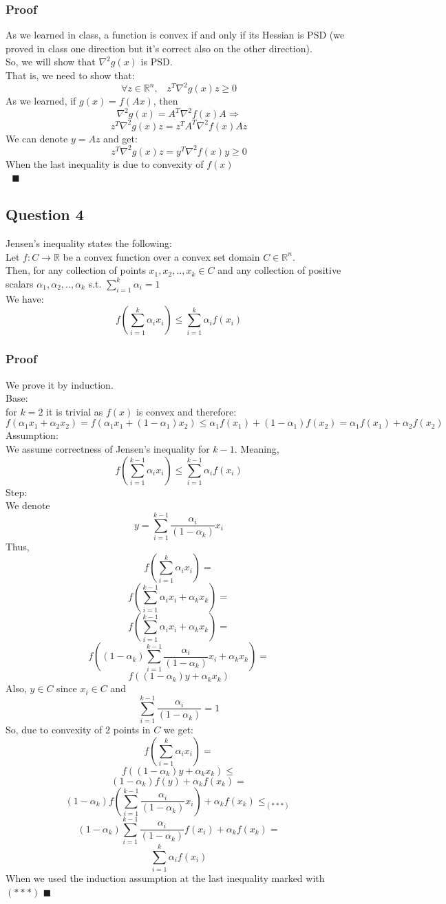 \documentclass[12pt]{article}
\newcommand{\qed}{\hfill$\blacksquare$}
\begin{document}
\subsubsection*{Proof}
As we learned in class, a function is convex if and only if its Hessian is PSD (we proved in class one direction but it's correct also on the other direction).\\
So, we will show that $\nabla^2 g(x)$ is PSD.\\
That is, we need to show that:
$$\forall z \in \mathbb{R}^n, \;\;\; z^T \nabla^2 g(x) z \geq 0$$
As we learned, if $g(x) = f(Ax)$, then 
$$\nabla^2 g(x) = A^T \nabla^2 f(x) A \Rightarrow$$
$$z^T \nabla^2 g(x) z = z^T A^T \nabla^2 f(x) A z$$
We can denote $y = Az$ and get:
$$z^T \nabla^2 g(x) z = y^T \nabla^2 f(x) y \geq 0$$
When the last inequality is due to convexity of $f(x)$\\
$\text{ }$\qed

\newpage
\subsection{Question 4}
Jensen's inequality states the following:\\
Let $f:C \rightarrow \mathbb{R}$ be a convex function over a convex set domain $C \in \mathbb{R}^n$.\\
Then, for any collection of points $x_1,x_2,..,x_k \in C$ and any collection of positive scalars $\alpha_1,\alpha_2,..,\alpha_k$ s.t. $\sum_{i=1}^k \alpha_i = 1$\\
We have:
$$f(\sum_{i=1}^k \alpha_i x_i) \leq \sum_{i=1}^k \alpha_i f(x_i)$$
\subsubsection*{Proof}
We prove it by induction.\\
Base:\\
for $k=2$ it is trivial as $f(x)$ is convex and therefore:
$$f(\alpha_1 x_1 + \alpha_2 x_2) = f(\alpha_1 x_1 + (1-\alpha_1) x_2) \leq \alpha_1 f(x_1) + (1-\alpha_1) f(x_2) = \alpha_1 f(x_1) + \alpha_2 f(x_2)$$
Assumption:\\
We assume correctness of Jensen's inequality for $k-1$. Meaning,
$$f(\sum_{i=1}^{k-1} \alpha_i x_i) \leq \sum_{i=1}^{k-1} \alpha_i f(x_i)$$
Step:\\
We denote $$y=\sum_{i=1}^{k-1} \frac{\alpha_i}{(1-\alpha_k)} x_i$$ Thus,
$$f(\sum_{i=1}^{k} \alpha_i x_i) = $$
$$f(\sum_{i=1}^{k-1} \alpha_i x_i + \alpha_k x_k) = $$
$$f(\sum_{i=1}^{k-1} \alpha_i x_i + \alpha_k x_k) =$$
$$ f((1-\alpha_k)\sum_{i=1}^{k-1} \frac{\alpha_i}{(1-\alpha_k)} x_i + \alpha_k x_k) =$$
$$f((1-\alpha_k)y + \alpha_k x_k)$$
Also, $y\in C$ since $x_i \in C$ and
$$\sum_{i=1}^{k-1} \frac{\alpha_i}{(1-\alpha_k)}=1$$
So, due to convexity of 2 points in $C$ we get:
$$f(\sum_{i=1}^{k} \alpha_i x_i) = $$
$$f((1-\alpha_k)y + \alpha_k x_k) \leq$$
$$(1-\alpha_k)f(y) + \alpha_k f(x_k) = $$
$$(1-\alpha_k) f(\sum_{i=1}^{k-1} \frac{\alpha_i}{(1-\alpha_k)} x_i) + \alpha_k f(x_k) \leq_{(***)}$$
$$(1-\alpha_k) \sum_{i=1}^{k-1} \frac{\alpha_i}{(1-\alpha_k)} f(x_i) + \alpha_k f(x_k) =$$
$$\sum_{i=1}^{k} \alpha_i f(x_i)$$
When we used the induction assumption at the last inequality marked with $(***)$
\qed
\newpage
\end{document}
